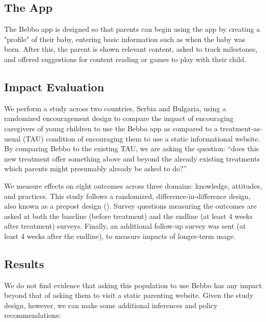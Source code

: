 \documentclass{article}
\begin{document}
\subsection*{The App}

The Bebbo app is designed so that parents can begin using the app by creating a "profile" of their baby, entering basic information such as when the baby was born. After this, the parent is shown relevant content, asked to track milestones, and offered suggestions for content reading or games to play with their child.

\subsection*{Impact Evaluation}

We perform a study across two countries, Serbia and Bulgaria, using a randomized encouragement design to compare the impact of encouraging caregivers of young children to use the Bebbo app as compared to a treatment-as-usual (TAU) condition of encouraging them to use a static informational website. By comparing Bebbo to the existing TAU, we are asking the question: “does this new treatment offer something above and beyond the already existing treatments which parents might presumably already be asked to do?”

We measure effects on eight outcomes across three domains: knowledge, attitudes, and practices. This study follows a randomized, difference-in-difference design, also known as a prepost design (\cite{Clifford2021}). Survey questions measuring the outcomes are asked at both the baseline (before treatment) and the endline (at least 4 weeks after treatment) surveys. Finally, an additional follow-up survey was sent (at least 4 weeks after the endline), to measure impacts of longer-term usage.

\subsection*{Results}

We do not find evidence that asking this population to use Bebbo has any impact beyond that of asking them to visit a static parenting website. Given the study design, however, we can make some additional inferences and policy recommendations:
\end{document}
